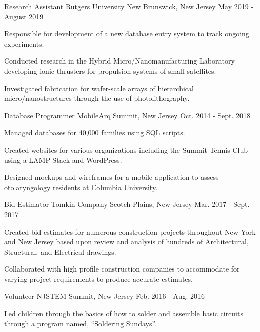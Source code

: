 \begin{cventries}
  \cventry
    {Research Assistant}
    {Rutgers University}
    {New Brunswick, New Jersey}
    {May 2019 - August 2019}
    {
      \begin{cvitems}
        \item {Responsible for development of a new database entry system to track ongoing experiments.}
        \item {Conducted research in the Hybrid Micro/Nanomanufacturing Laboratory developing ionic thrusters for propulsion systems of small satellites.}
        \item {Investigated fabrication for wafer-scale arrays of hierarchical micro/nanostructures through the use of photolithography.}
      \end{cvitems}
    }
  \cventry
    {Database Programmer}
    {MobileArq}
    {Summit, New Jersey}
    {Oct. 2014 - Sept. 2018}
    {
      \begin{cvitems}
        \item {Managed databases for 40,000 families using SQL scripts.}
        \item {Created websites for various organizations including the Summit Tennis Club using a LAMP Stack and WordPress.} 
        \item {Designed mockups and wireframes for a mobile application to assess otolaryngology residents at Columbia University.}
      \end{cvitems}
    }
  \cventry
    {Bid Estimator}
    {Tomkin Company}
    {Scotch Plains, New Jersey}
    {Mar. 2017 - Sept. 2017}
    {
      \begin{cvitems}
        \item {Created bid estimates for numerous construction projects throughout New York and New Jersey based upon review and analysis of hundreds of Architectural, Structural, and Electrical drawings.}
        \item {Collaborated with high profile construction companies to accommodate for varying project requirements to produce accurate estimates.}
      \end{cvitems}
    }
  \cventry
    {Volunteer}
    {NJSTEM}
    {Summit, New Jersey}
    {Feb. 2016 - Aug. 2016}
    {
      \begin{cvitems}
        \item {Led children through the basics of how to solder and assemble basic circuits through a program named, “Soldering Sundays”.}
      \end{cvitems}
    }
    \vspace{-2mm}

    
\end{cventries}
